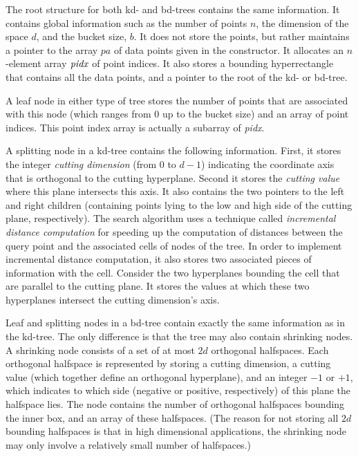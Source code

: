 \documentclass[11pt]{article}		%
\begin{document}
The root structure for both kd- and bd-trees contains the same
information.  It contains global information such as the number of
points $n$, the dimension of the space $d$, and the bucket size, $b$.
It does not store the points, but rather maintains a pointer to the
array $pa$ of data points given in the constructor.  It allocates an
$n$-element array $\it pidx$ of point indices.  It also stores a
bounding hyperrectangle that contains all the data points, and a pointer
to the root of the kd- or bd-tree.

A leaf node in either type of tree stores the number of points that are
associated with this node (which ranges from 0 up to the bucket size)
and an array of point indices.  This point index array is actually a
subarray of \textit{pidx}.

A splitting node in a kd-tree contains the following information.
First, it stores the integer \emph{cutting dimension} (from 0 to $d-1$)
indicating the coordinate axis that is orthogonal to the cutting
hyperplane.  Second it stores the \emph{cutting value} where this plane
intersects this axis.  It also contains the two pointers to the left and
right children (containing points lying to the low and high side of the
cutting plane, respectively).  The search algorithm uses a technique
called \emph{incremental distance computation} \cite{ArM93b} for
speeding up the computation of distances between the query point and the
associated cells of nodes of the tree.  In order to implement
incremental distance computation, it also stores two associated pieces
of information with the cell.  Consider the two hyperplanes bounding the
cell that are parallel to the cutting plane.  It stores the values at
which these two hyperplanes intersect the cutting dimension's axis.

Leaf and splitting nodes in a bd-tree contain exactly the same
information as in the kd-tree.  The only difference is that the tree may
also contain shrinking nodes.  A shrinking node consists of a set of at
most $2d$ orthogonal halfspaces.  Each orthogonal halfspace is
represented by storing a cutting dimension, a cutting value (which
together define an orthogonal hyperplane), and an integer $-1$ or $+1$,
which indicates to which side (negative or positive, respectively) of
this plane the halfspace lies.  The node contains the number of
orthogonal halfspaces bounding the inner box, and an array of these
halfspaces.  (The reason for not storing all $2d$ bounding halfspaces is
that in high dimensional applications, the shrinking node may only
involve a relatively small number of halfspaces.)
\end{document}

